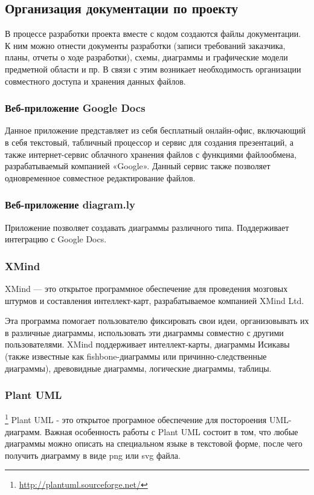 \subsection{Организация документации по проекту}
В процессе разработки проекта вместе с кодом создаются файлы документации. К ним
можно отнести документы разработки (записи требований заказчика, планы, отчеты о
ходе разработки), схемы, диаграммы и графические модели предметной области и пр.
В связи с этим возникает необходимость организации совместного доступа и
хранения данных файлов.

\subsubsection{Веб-приложение  Google Docs}
Данное приложение представляет из себя бесплатный онлайн-офис, включающий в себя
текстовый, табличный процессор и сервис для создания презентаций, а также
интернет-сервис облачного хранения файлов с функциями файлообмена,
разрабатываемый компанией «Google». Данный сервис также позволяет одновременное
совместное редактирование файлов.

\subsubsection{Веб-приложение diagram.ly}
Приложение позволяет создавать диаграммы различного типа. Поддерживает интеграцию с Google Docs.

\subsubsection{XMind}
XMind — это открытое программное обеспечение для проведения мозговых штурмов и
составления интеллект-карт, разрабатываемое компанией XMind Ltd.

Эта программа помогает пользователю фиксировать свои идеи, организовывать их в
различные диаграммы, использовать эти диаграммы совместно с другими
пользователями. XMind поддерживает интеллект-карты, диаграммы Исикавы (также
известные как fishbone-диаграммы или причинно-следственные диаграммы),
древовидные диаграммы, логические диаграммы, таблицы.

\subsubsection{Plant UML}\footnote{
	\url{http://plantuml.sourceforge.net/}
}
Plant UML - это открытое програмное обеспечение для постороения UML-диаграмм.
Важная особенность работы с Plant UML состоит в том, что любые диаграммы можно
описать на специальном языке в текстовой форме, после чего получить диаграмму в
виде png или svg файла.
